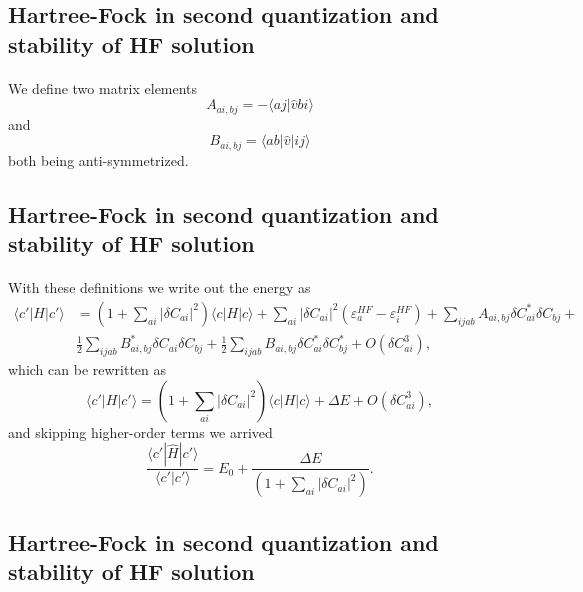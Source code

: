 \documentclass[%
twoside,                 %
final,                   %
10pt]{article}
\begin{document}
\subsection*{Hartree-Fock in second quantization and stability of HF solution}

\paragraph{}
We define two matrix elements
\[
A_{ai,bj}=-\langle aj|\hat{v} bi\rangle
\]
and
\[
B_{ai,bj}=\langle ab|\hat{v}|ij\rangle
\]
both being anti-symmetrized.



\subsection*{Hartree-Fock in second quantization and stability of HF solution}

\paragraph{}

With these definitions we write out the energy as
\begin{align}
\langle c'|H|c'\rangle& = \left(1+\sum_{ai}|\delta C_{ai}|^2\right)\langle c |H|c\rangle+\sum_{ai}|\delta C_{ai}|^2(\varepsilon_a^{HF}-\varepsilon_i^{HF})+\sum_{ijab}A_{ai,bj}\delta C_{ai}^*\delta C_{bj}+\\
&\frac{1}{2} \sum_{ijab} B_{ai,bj}^*\delta C_{ai}\delta C_{bj}+\frac{1}{2} \sum_{ijab} B_{ai,bj}\delta C_{ai}^*\delta C_{bj}^*
+O(\delta C_{ai}^3),
\end{align}
which can be rewritten as
\[
\langle c'|H|c'\rangle = \left(1+\sum_{ai}|\delta C_{ai}|^2\right)\langle c |H|c\rangle+\Delta E+O(\delta C_{ai}^3),
\]
and skipping higher-order terms we arrived
\[
\frac{\langle c' |\hat{H} | c'\rangle}{\langle c' |c'\rangle} =E_0+\frac{\Delta E}{\left(1+\sum_{ai}|\delta C_{ai}|^2\right)}.
\]



\subsection*{Hartree-Fock in second quantization and stability of HF solution}

\end{document}
